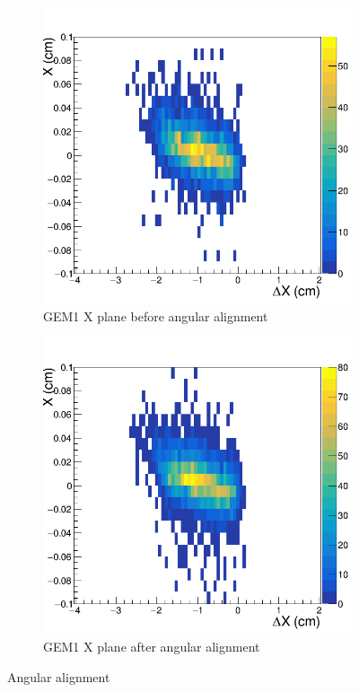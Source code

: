 \begin{figure}[h!]
\centering
 \begin{subfigure}[l]{.45\textwidth}
   \centering
   \includegraphics[width=\linewidth]{thesis_figures/alignment/Run_3211_T/G1X_after_millepede_U.png}

   \caption{GEM1 X plane before angular alignment}
 \end{subfigure}
 \begin{subfigure}[r]{.45\textwidth}
   \centering
   \includegraphics[width=\linewidth]{thesis_figures/alignment/Run_3211_T/G1X_after_millepede_T.png}
   \caption{GEM1 X plane after angular alignment}
   \label{fig:GEM1X_after_T}
 \end{subfigure}
 \caption{Angular alignment}
 \label{fig:GEM1_T_align}
 \end{figure}

